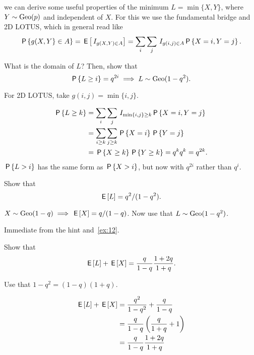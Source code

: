  we can derive some useful properties of the minimum $L=\min\{X, Y\}$, where $Y\sim \Geo{p}$ and independent of $X$. For this we use the fundamental bridge and 2D LOTUS, which in general read like
  \begin{equation*} %
\P{g(X,Y}\in A\} = \E{\1{g(X, Y) \in A}} = \sum_{i}\sum_j \1{g(i, j)\in A} \P{X=i, Y=j}.
  \end{equation*}


\begin{exercise}
What is the domain of $L$? Then, show that
\begin{equation*}
\P{L\geq i}=q^{2i} \implies L\sim\Geo{1-q^{2}}.
\end{equation*}
\begin{hint}
For 2D LOTUS, take $g(i,j) = \min\{i, j\}$.
\end{hint}
\begin{solution}
  \begin{align*}
\P{L\geq k}
&= \sum_{i}\sum_{j} \1{\min\{i,j\}\geq k} \P{X=i, Y=j}\\
&= \sum_{i\geq k} \sum_{j\geq k} \P{X=i}\P{Y=j}\\
&=  \P{X\geq k}\P{Y\geq k} = q^{k} q^{k} = q^{2k}.
  \end{align*}
$\P{L>i}$ has the same form as $\P{X>i}$, but now with $q^{2i}$ rather than $q^{i}$.
\end{solution}
\end{exercise}



\begin{exercise}\label{ex:3}
Show that
\begin{equation*}
\E L=q^{2}/(1-q^{2}).
\end{equation*}
\begin{hint}
$X\sim \Geo{1-q} \implies \E X = q/(1-q)$. Now use that $L\sim\Geo{1-q^{2}}$.
\end{hint}
\begin{solution}
  Immediate from the hint and~\cref{ex:12}.
\end{solution}
\end{exercise}

\begin{exercise}
Show that
\begin{equation}   \label{eq:39}
\E L + \E X = \frac q{1-q}\frac{1+2q}{1+q}.
\end{equation}
\begin{hint}
Use that $1-q^2=(1-q)(1+q)$.
\end{hint}
\begin{solution}
  \begin{align*}
\E L     + \E X
&= \frac{q^{2}}{1-q^2} + \frac{q}{1-q} \\
&= \frac q{1-q}\left(\frac{q}{1+q} + 1\right)\\
&= \frac q{1-q} \frac{1+2q}{1+q}
  \end{align*}
\end{solution}
\end{exercise}

